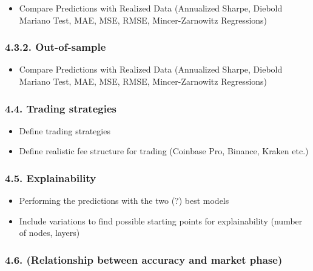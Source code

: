 \documentclass[
]{article}
\providecommand{\tightlist}{%
  \setlength{\itemsep}{0pt}\setlength{\parskip}{0pt}}
\begin{document}
\begin{itemize}
\tightlist
\item
  Compare Predictions with Realized Data (Annualized Sharpe, Diebold
  Mariano Test, MAE, MSE, RMSE, Mincer-Zarnowitz Regressions)
\end{itemize}

\hypertarget{out-of-sample}{%
\subsubsection{4.3.2. Out-of-sample}\label{out-of-sample}}

\begin{itemize}
\tightlist
\item
  Compare Predictions with Realized Data (Annualized Sharpe, Diebold
  Mariano Test, MAE, MSE, RMSE, Mincer-Zarnowitz Regressions)
\end{itemize}

\hypertarget{trading-strategies}{%
\subsubsection{4.4. Trading strategies}\label{trading-strategies}}

\begin{itemize}
\item
  Define trading strategies
\item
  Define realistic fee structure for trading (Coinbase Pro, Binance,
  Kraken etc.)
\end{itemize}

\hypertarget{explainability}{%
\subsubsection{4.5. Explainability}\label{explainability}}

\begin{itemize}
\item
  Performing the predictions with the two (?) best models
\item
  Include variations to find possible starting points for explainability
  (number of nodes, layers)
\end{itemize}

\hypertarget{relationship-between-accuracy-and-market-phase}{%
\subsubsection{4.6. (Relationship between accuracy and market
phase)}\label{relationship-between-accuracy-and-market-phase}}
\end{document}

